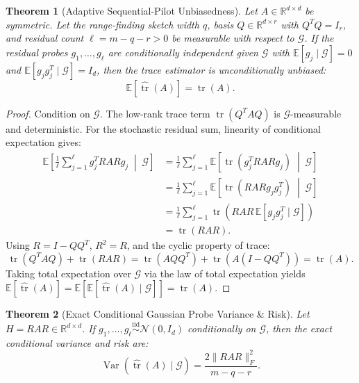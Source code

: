 \documentclass[11pt,letterpaper]{article}
\newtheorem{theorem}{Theorem}
\begin{document}
\begin{theorem}[Adaptive Sequential-Pilot Unbiasedness]
\label{thm:unbiasedness}
Let $A \in \mathbb{R}^{d \times d}$ be symmetric. Let the range-finding sketch width $q$, basis $Q \in \mathbb{R}^{d \times r}$ with $Q^T Q = I_r$, and residual count $\ell = m - q - r > 0$ be measurable with respect to $\mathcal{G}$. If the residual probes $g_1, \dots, g_\ell$ are conditionally independent given $\mathcal{G}$ with $\mathbb{E}[g_j \mid \mathcal{G}] = 0$ and $\mathbb{E}[g_j g_j^T \mid \mathcal{G}] = I_d$, then the trace estimator is unconditionally unbiased:
\begin{equation}
\mathbb{E}[\widehat{\operatorname{tr}}(A)] = \operatorname{tr}(A).
\end{equation}
\end{theorem}

\begin{proof}
Condition on $\mathcal{G}$. The low-rank trace term $\operatorname{tr}(Q^T AQ)$ is $\mathcal{G}$-measurable and deterministic. For the stochastic residual sum, linearity of conditional expectation gives:
\begin{align}
\mathbb{E}\left[ \frac{1}{\ell} \sum_{j=1}^\ell g_j^T R A R g_j \;\middle|\; \mathcal{G} \right] 
&= \frac{1}{\ell} \sum_{j=1}^\ell \mathbb{E}\left[ \operatorname{tr}(g_j^T R A R g_j) \;\middle|\; \mathcal{G} \right] \\
&= \frac{1}{\ell} \sum_{j=1}^\ell \mathbb{E}\left[ \operatorname{tr}(R A R g_j g_j^T) \;\middle|\; \mathcal{G} \right] \\
&= \frac{1}{\ell} \sum_{j=1}^\ell \operatorname{tr}\left( R A R \, \mathbb{E}[g_j g_j^T \mid \mathcal{G}] \right) \\
&= \operatorname{tr}(R A R).
\end{align}
Using $R = I - QQ^T$, $R^2 = R$, and the cyclic property of trace:
\begin{equation}
\operatorname{tr}(Q^T AQ) + \operatorname{tr}(RAR) = \operatorname{tr}(AQQ^T) + \operatorname{tr}(A(I - QQ^T)) = \operatorname{tr}(A).
\end{equation}
Taking total expectation over $\mathcal{G}$ via the law of total expectation yields $\mathbb{E}[\widehat{\operatorname{tr}}(A)] = \mathbb{E}[\mathbb{E}[\widehat{\operatorname{tr}}(A) \mid \mathcal{G}]] = \operatorname{tr}(A)$.
\end{proof}

\begin{theorem}[Exact Conditional Gaussian Probe Variance \& Risk]
\label{thm:gaussian_var}
Let $H = RAR \in \mathbb{R}^{d \times d}$. If $g_1, \dots, g_\ell \overset{\text{iid}}{\sim} \mathcal{N}(0, I_d)$ conditionally on $\mathcal{G}$, then the exact conditional variance and risk are:
\begin{equation}
\operatorname{Var}(\widehat{\operatorname{tr}}(A) \mid \mathcal{G}) = \frac{2 \|RAR\|_F^2}{m - q - r}.
\end{equation}
\end{theorem}
\end{document}
